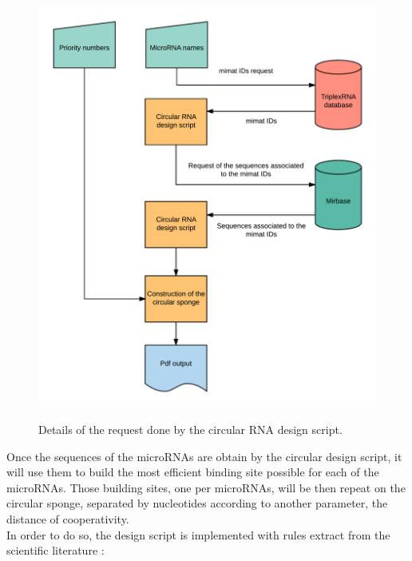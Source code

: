\documentclass[a4paper,12pt]{report}
\begin{document}
\begin{figure}[H]
	\centering
	{\includegraphics[width=1\textwidth]{Blank.png}}
	\caption{Details of the request done by the circular RNA design script.}
\end{figure}

Once the sequences of the microRNAs are obtain by the circular design script, it will use them to build the most efficient binding site possible for each of the microRNAs. Those building sites, one per microRNAs, will be then repeat on the circular sponge, separated by nucleotides according to another parameter, the distance of cooperativity\cite{coop}. \\

In order to do so, the design script is implemented with rules extract from the scientific literature :
\end{document}
